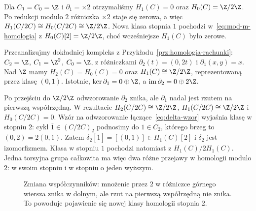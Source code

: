 \begin{przyklad}
Dla $C_1=C_0=\Z$ i $\partial_1=\times2$
otrzymaliśmy $H_1(C)=0$ oraz
$H_0(C)=\Z/2\Z$. Po redukcji modulo
$2$ różniczka $\times2$ staje się
zerowa, a więc
$H_1(C/2C)\cong H_0(C/2C)\cong\Z/2\Z$.
Nowa klasa stopnia $1$ pochodzi
w~\eqref{eq:mod-m-homologia} z
$H_0(C)[2]=\Z/2\Z$, choć wcześniejsze
$H_1(C)$ było zerowe.
\end{przyklad}

\begin{przyklad}
\label{prz:redukcja-mod2-trzy-stopnie}
Przeanalizujmy dokładniej kompleks z
Przykładu~\ref{prz:homologia-rachunki}:
$C_2=\Z$, $C_1=\Z^2$, $C_0=\Z$,
z różniczkami
$\partial_2(t)=(0,2t)$ i $\partial_1(x,y)=x$.
Nad $\Z$ mamy $H_2(C)=H_0(C)=0$
oraz $H_1(C)\cong\Z/2\Z$, reprezentowaną
przez klasę $(0,1)$. Istotnie,
$\ker\partial_1=0\oplus\Z$,
a $\operatorname{im}\partial_2=0\oplus2\Z$.

Po przejściu do $\Z/2\Z$ odwzorowanie
$\partial_2$ znika, ale $\partial_1$
nadal jest rzutem na pierwszą współrzędną.
W rezultacie
$H_2(C/2C)\cong\Z/2\Z$,
$H_1(C/2C)\cong\Z/2\Z$ i
$H_0(C/2C)=0$. Wzór na odwzorowanie
łączące~\eqref{eq:delta-wzor} wyjaśnia
klasę w stopniu $2$: cykl
$\bar1\in(C/2C)_2$ podnosimy do $1\in C_2$,
którego brzeg to $(0,2)=2(0,1)$.
Zatem
$\delta_2[\bar1]=[(0,1)]\in H_1(C)[2]$
i $\delta_2$ jest izomorfizmem.
Klasa w stopniu $1$ pochodzi natomiast
z $H_1(C)/2H_1(C)$.
Jedna torsyjna grupa całkowita ma więc
dwa różne przejawy w homologii modulo $2$:
w swoim stopniu i w stopniu o jeden wyższym.
\end{przyklad}

\begin{figure}[!htbp]
\centering
{}
\caption{Zmiana współczynników: mnożenie przez $2$
w różniczce górnego wiersza znika w dolnym,
ale rzut na pierwszą współrzędną nie znika.
To powoduje pojawienie się nowej klasy homologii stopnia $2$.}
\label{fig:redukcja-mod2-top}
\end{figure}

